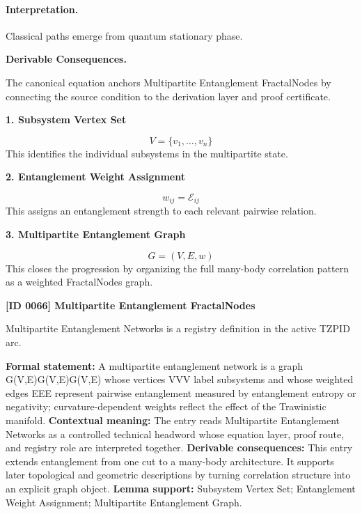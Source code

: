 \paragraph{Interpretation.}
Classical paths emerge from quantum stationary phase.

\par\vspace{0.35em}
\noindent\textbf{Derivable Consequences.}\quad
\begingroup
\footnotesize
\raggedright
The canonical equation anchors Multipartite Entanglement FractalNodes by connecting the source condition to the derivation layer and proof certificate.
\par\endgroup

\noindent\textbf{1. Subsystem Vertex Set}\par
\[
V = \{v_{1},\dots,v_{n}\}
\]
\noindent This identifies the individual subsystems in the multipartite state.\par
\noindent\textbf{2. Entanglement Weight Assignment}\par
\[
w_{ij} = \mathcal{E}_{ij}
\]
\noindent This assigns an entanglement strength to each relevant pairwise relation.\par
\noindent\textbf{3. Multipartite Entanglement Graph}\par
\[
G = (V,E,w)
\]
\noindent This closes the progression by organizing the full many-body correlation pattern as a weighted FractalNodes graph.\par

\clearpage
\noindent\textbf{[ID 0066] Multipartite Entanglement FractalNodes}\par
\vspace{0.35em}
\begingroup\small
{}
Multipartite Entanglement Networks is a registry definition in the active TZPID arc.

\begingroup\footnotesize\setlength{\emergencystretch}{3em}\sloppy
\textbf{Formal statement:} A multipartite entanglement network is a graph G(V,E)G(V,E)G(V,E) whose vertices VVV label subsystems and whose weighted edges EEE represent pairwise entanglement measured by entanglement entropy or negativity; curvature-dependent weights reflect the effect of the Trawinistic manifold. \textbf{Contextual meaning:} The entry reads Multipartite Entanglement Networks as a controlled technical headword whose equation layer, proof route, and registry role are interpreted together. \textbf{Derivable consequences:} This entry extends entanglement from one cut to a many-body architecture. It supports later topological and geometric descriptions by turning correlation structure into an explicit graph object. \textbf{Lemma support:} Subsystem Vertex Set; Entanglement Weight Assignment; Multipartite Entanglement Graph.\par
\endgroup

